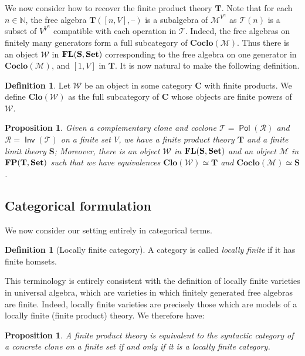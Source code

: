 \documentclass[11pt, a4paper, twoside,leqno]{amsart}
\newcommand{\cat}[1]{\mathbf{#1}}
\newcommand{\thg}{{\mathord{\text{--}}}}
\numberwithin{equation}{section}
\theoremstyle{plain}
\newtheorem{Prop}[Thm]{Proposition}
\theoremstyle{definition}
\newtheorem{Defn}[Thm]{Definition}
\newcommand{\Set}{\cat{Set}}
\DeclareMathOperator{\FP}{\bf FP}
\DeclareMathOperator{\FL}{\bf FL}
\DeclareMathOperator{\Pol}{\mathsf{Pol}}
\DeclareMathOperator{\Inv}{\mathsf{Inv}}
\begin{document}
We now consider how to recover the finite product theory \(\cat{T}\). Note that for each \(n\in \mathbb{N}
\), the free algebra \(\cat{T}([n,V],\thg)\) is a subalgebra of
\(\mathcal{M}^{V^{n}}\) as \(\mathscr{T}(n)
\) is a subset of \(V^{V^{n}}\) compatible with each operation in \(\mathscr{T}
\). Indeed, the free algebras on
finitely many generators form a full subcategory of \(\cat{Coclo}(\mathcal{M})\). Thus there is an
object \(\mathcal{W}\) in \(\FL(\cat{S}, \cat{Set})\) corresponding
to the free algebra on one generator in
\(\cat{Coclo}(\mathcal{M})\), and \([1,V]\) in \(\cat{T}\). It is now
natural to make the following definition.

\begin{Defn}
  \label{def:clone-of-obj}
  Let \(\mathcal{W}\) be an object in some category \(\cat{C}\) with finite
  products. We define \(\cat{Clo(\mathcal{W})}\) as the full subcategory of
  \(\cat{C}\) whose objects are finite powers of \(\mathcal{W}\).
\end{Defn}

\begin{Prop}
  \label{prop:clo-coclo-equiv}
  Given a complementary clone and coclone \(\mathscr{T} = \Pol(\mathscr{R}
  )
  \) and \(\mathscr{R} = \Inv(\mathscr{T}
  )\) on a finite set \(V\), we have a finite product
  theory \(\cat{T}\) and a finite limit theory \(\cat{S}\); Moreover, there is
  an object \(\mathcal{W}\) in \(\FL(\cat{S},\Set)\) and an object
  \(\mathcal{M}\) in \(\FP(\cat{T}, \cat{Set})\) such
  that we have equivalences \(\cat{Clo(\mathcal{W})} \simeq \cat{T}\) and
  \(\cat{Coclo(\mathcal{M})} \simeq \cat{S}\).
\end{Prop}

\subsection{Categorical formulation}
\label{sec:categ-form}

We now consider our setting entirely in categorical terms.
\begin{Defn}[Locally finite category]
  \label{def:lfc}
  A category is called \emph{locally
    finite} if it has finite homsets.
\end{Defn}
This terminology is entirely consistent with the definition of locally
  finite varieties in universal algebra, which are varieties in which
  finitely generated free algebras are finite. Indeed, locally finite
  varieties are precisely those which are models of a locally finite
  (finite product) theory. We therefore have:
\begin{Prop}
  \label{prop:concr-clo-loc-fin-theory}
  A finite product theory is equivalent to the syntactic category of a
  concrete clone on a finite set if and only if it is a locally finite category. 
\end{Prop}
\end{document}
